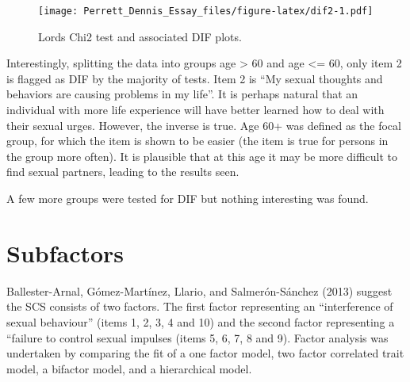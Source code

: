 \documentclass[
  man,floatsintext]{apa6}
\begin{document}
\begin{figure}
\centering
\texttt{[image: Perrett\_Dennis\_Essay\_files/figure-latex/dif2-1.pdf]}
\caption{\label{fig:dif2}Lords Chi2 test and associated DIF plots.}
\end{figure}

Interestingly, splitting the data into groups age \textgreater{} 60 and age \textless= 60, only item 2 is flagged as DIF by the majority of tests. Item 2 is ``My sexual thoughts and behaviors are causing problems in my life''. It is perhaps natural that an individual with more life experience will have better learned how to deal with their sexual urges. However, the inverse is true. Age 60+ was defined as the focal group, for which the item is shown to be easier (the item is true for persons in the group more often). It is plausible that at this age it may be more difficult to find sexual partners, leading to the results seen.

A few more groups were tested for DIF but nothing interesting was found.

\hypertarget{subfactors}{%
\section{Subfactors}\label{subfactors}}

Ballester-Arnal, Gómez-Martínez, Llario, and Salmerón-Sánchez (2013) suggest the SCS consists of two factors. The first factor representing an ``interference of sexual behaviour'' (items 1, 2, 3, 4 and 10) and the second factor representing a ``failure to control sexual impulses (items 5, 6, 7, 8 and 9). Factor analysis was undertaken by comparing the fit of a one factor model, two factor correlated trait model, a bifactor model, and a hierarchical model.

\begin{table}[H]
\centering\begingroup\fontsize{7}{9}\selectfont

\endgroup{}
\end{table}
\end{document}
